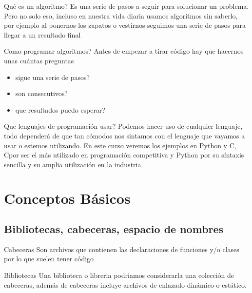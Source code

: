 \documentclass{beamer}
\newcommand{\Rplus}{\protect\hspace{-.1em}\protect\raisebox{.35ex}{\smaller{\smaller\textbf{+}}}}
\newcommand{\Cpp}{\mbox{C\Rplus\Rplus}\hspace{3pt}}
\begin{document}
\begin{frame}{\textquestiondown Qué es un algoritmo?}
Es una serie de pasos a seguir para solucionar un problema.\newline
Pero no solo eso, incluso en nuestra vida diaria usamos algoritmos sin saberlo, por ejemplo al ponernos los zapatos o vestirnos seguimos una serie de pasos para llegar a un resultado final
\end{frame}

\begin{frame}{\textquestiondown Como programar algoritmos?}
Antes de empezar a tirar código hay que hacernos unas cu\'antas preguntas
    \begin{itemize}
        \item \textquestiondown sigue una serie de pasos?
        \item \textquestiondown son consecutivos?
        \item \textquestiondown que resultados puedo esperar?
    \end{itemize}
\end{frame}

\begin{frame}{\textquestiondown Que lenguajes de programaci\'on usar?}
Podemos hacer uso de cualquier lenguaje, todo depender\'a de que tan c\'omodos nos sintamos con el lenguaje
que vayamos a usar o estemos utilizando.\newline
En este curso veremos los ejemplos en Python y \Cpp, \Cpp por ser el m\'as utilizado en programaci\'on competitiva y Python por su s\'intaxis sencilla y su amplia utilizaci\'on en la industria.
\end{frame}

\section{Conceptos B\'asicos}

\subsection{Bibliotecas, cabeceras, espacio de nombres}

\begin{frame}{Cabeceras}
        Son archivos que contienen las declaraciones de funciones y/o clases por lo que suelen tener c\'odigo
\end{frame}

\begin{frame}{Bibliotecas}
    Una biblioteca o libreria podriamos considerarla una colecci\'on de cabeceras, adem\'as de cabeceras incluye archivos de enlazado din\'amico o est\'atico.
\end{frame}
\end{document}
